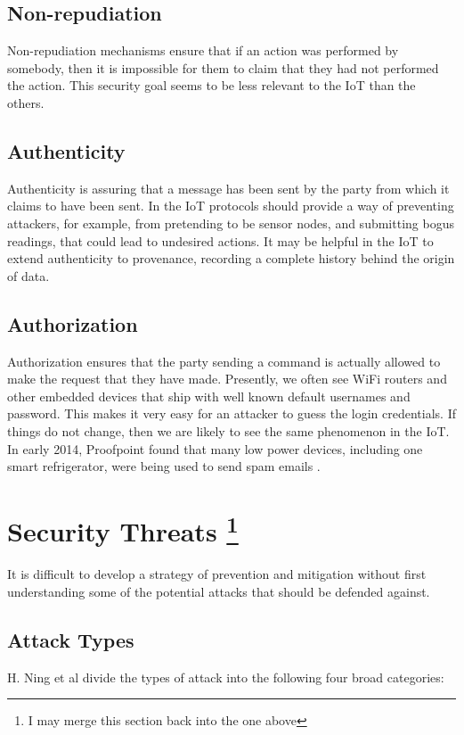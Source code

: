 \documentclass[10pt,journal,compsoc]{IEEEtran}
\begin{document}
\subsection{Non-repudiation}
Non-repudiation mechanisms ensure that if an action was performed by somebody,
then it is impossible for them to claim that they had not performed the action.
This security goal seems to be less relevant to the IoT than the others. 

\subsection{Authenticity}
Authenticity is assuring that a message has been sent by the party from which
it claims to have been sent. In the IoT protocols should provide a way of
preventing attackers, for example, from pretending to be sensor nodes, and
submitting bogus readings, that could lead to undesired actions. It may be
helpful in the IoT to extend authenticity to provenance, recording a complete
history behind the origin of data.  

\subsection{Authorization}
Authorization ensures that the party sending a command is actually allowed
to make the request that they have made. Presently, we often see WiFi routers
and other embedded devices that ship with well known default usernames
and password. This makes it very easy for an attacker to guess the login
credentials. If things do not change, then we are likely to see the same
phenomenon in the IoT. In early 2014, Proofpoint found that many low power
devices, including one smart refrigerator, were being used to send spam emails
\cite{Proofpoint2014}.


\section{Security Threats \footnote{I may merge this section back into the one above} }
It is difficult to develop a strategy of prevention and mitigation without
first understanding some of the potential attacks that should be defended
against.  

\subsection{Attack Types}
H. Ning et al \cite{Ning2013} divide the types of attack into the following
four broad categories:
\end{document}
